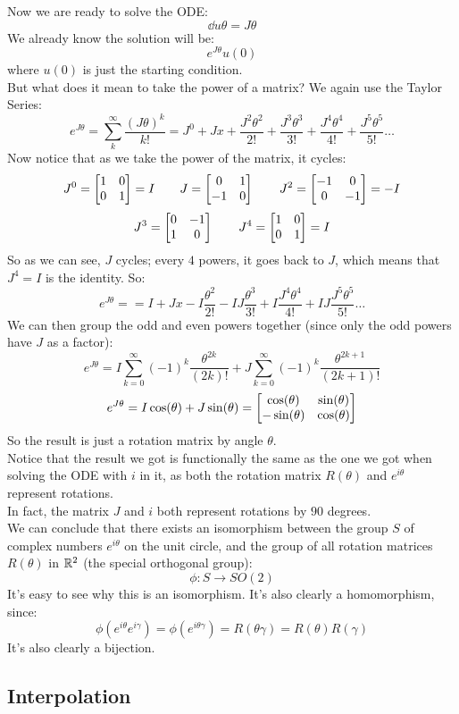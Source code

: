 \documentclass[12pt]{article}
\begin{document}
Now we are ready to solve the ODE:
\[ \dd{u}{\theta} = J\theta \]
We already know the solution will be:
\[ e^{J\theta}u(0) \]
where $u(0)$ is just the starting condition. \\
But what does it mean to take the power of a
matrix? 
We again use the Taylor Series:
\[ e^{J\theta} = \sum_{k}^{\infty} 
\dfrac{(J\theta)^k}{k!} 
= J^0 + Jx + \dfrac{J^2\theta^2}{2!}
+ \dfrac{J^3\theta^3}{3!} + \dfrac{J^4\theta^4}{4!}
+ \dfrac{J^5\theta^5}{5!} \dots \]
Now notice that as we take the power of the
matrix, it cycles:
\[ J^0 = \begin{bmatrix} 1 & 0 \\ 0 & 1 \end{bmatrix} = I \qquad
J = \begin{bmatrix} 0 & 1 \\ -1 & 0 \end{bmatrix}
\qquad J^2 = \begin{bmatrix} -1 & 0 \\ 0 & -1 \end{bmatrix} = -I \]
\[ J^3 = \begin{bmatrix} 0 & -1 \\ 1 & 0 \end{bmatrix}
\qquad J^4 = \begin{bmatrix} 1 & 0 \\ 0 & 1 \end{bmatrix} = I \]
So as we can see, $J$ cycles;
every $4$ powers, it goes back to $J$,
which means that $J^4 = I$ is the identity.
So:
\[ e^{J\theta} =
= I + Jx -I\dfrac{\theta^2}{2!}
- IJ\dfrac{\theta^3}{3!} + I\dfrac{J^4\theta^4}{4!}
+ IJ\dfrac{J^5\theta^5}{5!} \dots \]
We can then group the odd and even powers
together (since only the odd powers have $J$
as a factor):
\[ e^{J\theta}
= I\sum_{k = 0}^{\infty} 
(-1)^{k} \dfrac{\theta^{2k}}{(2k)!}
+ J\sum_{k = 0}^{\infty} (-1)^{k}
\dfrac{\theta^{2k + 1}}{(2k + 1)!} \]
\[ e^{J\theta} = I\cos(\theta) + J\sin(\theta)
= \begin{bmatrix} \cos(\theta) & \sin(\theta) \\ -\sin(\theta) & \cos(\theta) \end{bmatrix} \]
So the result is just a rotation matrix
by angle $\theta$. \\

Notice that the result we got is functionally
the same as the one we got when solving the
ODE with $i$ in it,
as both the rotation matrix $R(\theta)$
and $e^{i\theta}$ represent rotations. \\
In fact, the matrix $J$ and $i$
both represent rotations by $90$ degrees. \\

We can conclude that there exists
an isomorphism between the group $S$
of complex numbers $e^{i\theta}$
on the unit circle, and the group of
all rotation matrices $R(\theta)$
in $\mathbb{R}^2$ (the special orthogonal group):
\[ \phi: S \to SO(2) \]
It's easy to see why this is an isomorphism.
It's also clearly a homomorphism,
since:
\[ \phi(e^{i\theta}e^{i\gamma})
= \phi(e^{i\theta \gamma})
= R(\theta \gamma) = R(\theta)R(\gamma) \]
It's also clearly a bijection. \\

\newpage

\subsection*{Interpolation}
\end{document}
